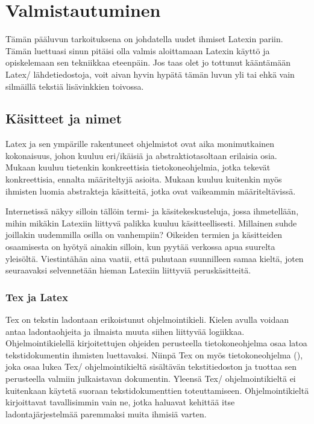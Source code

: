 
\chapter{Valmistautuminen}

Tämän pääluvun tarkoituksena on johdatella uudet ihmiset Latexin pariin.
Tämän luettuasi sinun pitäisi olla valmis aloittamaan Latexin käyttö ja
opiskelemaan sen tekniikkaa eteenpäin. Jos taas olet jo tottunut
kääntämään Latex\-/ lähdetiedostoja, voit aivan hyvin hypätä tämän luvun
yli tai ehkä vain silmäillä tekstiä lisävinkkien toivossa.

\section{Käsitteet ja nimet}

Latex ja sen ympärille rakentuneet ohjelmistot ovat aika monimutkainen
kokonaisuus, johon kuuluu eri\-/ikäisiä ja abstraktiotasoltaan erilaisia
osia. Mukaan kuuluu tietenkin konkreettisia tietokoneohjelmia, jotka
tekevät konkreettisia, ennalta määriteltyjä asioita. Mukaan kuuluu
kuitenkin myös ihmisten luomia abstrakteja käsitteitä, jotka ovat
vaikeammin määriteltävissä.

Internetissä näkyy silloin tällöin termi- ja käsitekeskusteluja, jossa
ihmetellään, mihin mikäkin Latexiin liittyvä palikka kuuluu
käsitteellisesti. Millainen suhde joillakin uudemmilla osilla on
vanhempiin? Oikeiden termien ja käsitteiden osaamisesta on hyötyä
ainakin silloin, kun pyytää verkossa apua suurelta yleisöltä.
Viestintähän aina vaatii, että puhutaan suunnilleen samaa kieltä, joten
seuraavaksi selvennetään hieman Latexiin liittyviä peruskäsitteitä.

\subsection{Tex ja Latex}

Tex on tekstin ladontaan erikoistunut ohjelmointikieli. Kielen avulla
voidaan antaa ladontaohjeita ja ilmaista muuta siihen liittyvää
logiikkaa. Ohjelmointikielellä kirjoitettujen ohjeiden perusteella
tietokoneohjelma osaa latoa tekstidokumentin ihmisten luettavaksi.
Niinpä Tex on myös tietokoneohjelma (), joka osaa lukea
Tex\-/ ohjelmointikieltä sisältävän tekstitiedoston ja tuottaa sen
perusteella valmiin julkaistavan dokumentin. Yleensä Tex\-/
ohjelmointikieltä ei kuitenkaan käytetä suoraan tekstidokumenttien
toteuttamiseen. Ohjelmointikieltä kirjoittavat tavallisimmin vain ne,
jotka haluavat kehittää itse ladontajärjestelmää paremmaksi muita
ihmisiä varten.


